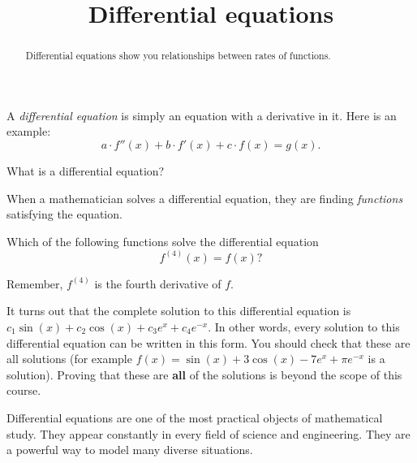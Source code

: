 \documentclass{ximera}
\title[Dig-In:]{Differential equations}
\begin{document}
\begin{abstract}
  Differential equations show you relationships between rates of
  functions.
\end{abstract}
\maketitle

A \textit{differential equation} is
simply an equation with a derivative in it. Here is an example:
\[
a\cdot f''(x) + b\cdot f'(x) + c\cdot f(x) = g(x). 
\]
\begin{question}
  What is a differential equation?
  \begin{multipleChoice}
  \end{multipleChoice}
\end{question}

When a mathematician solves a differential equation, they are finding
\textit{functions} satisfying the equation.
\begin{question}
  Which of the following functions solve the differential equation
  \[
  f^{(4)}(x) = f(x)?
  \]
  \begin{hint}
    Remember, $f^{(4)}$ is the fourth derivative of $f$.
  \end{hint}
  \begin{selectAll}
  \end{selectAll}
\end{question}


It turns out that the complete solution to this differential equation
is $c_1\sin(x)+c_2\cos(x)+c_3e^x+c_4e^{-x}$.  In other words, every
solution to this differential equation can be written in this form.
You should check that these are all solutions (for example $f(x) =
\sin(x)+3\cos(x)-7e^x+\pi e^{-x}$ is a solution).  Proving that these
are \textbf{all} of the solutions is beyond the scope of this course.

Differential equations are one of the most practical objects of
mathematical study.  They appear constantly in every field of science
and engineering.  They are a powerful way to model many diverse
situations.
\end{document}
